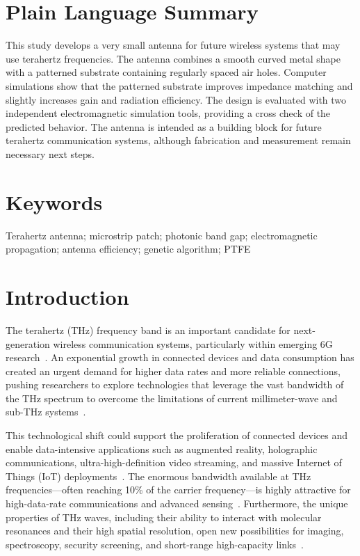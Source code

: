 \documentclass[draft]{agujournal2019}
\begin{document}
\section*{Plain Language Summary}
This study develops a very small antenna for future wireless systems that may use terahertz frequencies. The antenna combines a smooth curved metal shape with a patterned substrate containing regularly spaced air holes. Computer simulations show that the patterned substrate improves impedance matching and slightly increases gain and radiation efficiency. The design is evaluated with two independent electromagnetic simulation tools, providing a cross check of the predicted behavior. The antenna is intended as a building block for future terahertz communication systems, although fabrication and measurement remain necessary next steps.

\section*{Keywords}
Terahertz antenna; microstrip patch; photonic band gap; electromagnetic propagation; antenna efficiency; genetic algorithm; PTFE

\section{Introduction}
The terahertz (THz) frequency band is an important candidate for next-generation wireless communication systems, particularly within emerging 6G research~\cite{strinati_6g_2019,he_overview_2020}. An exponential growth in connected devices and data consumption has created an urgent demand for higher data rates and more reliable connections, pushing researchers to explore technologies that leverage the vast bandwidth of the THz spectrum to overcome the limitations of current millimeter-wave and sub-THz systems~\cite{jamshed_antenna_2020,hajiyat_antenna_2021}.

This technological shift could support the proliferation of connected devices and enable data-intensive applications such as augmented reality, holographic communications, ultra-high-definition video streaming, and massive Internet of Things (IoT) deployments~\cite{jornet_internet_2012,amin_step_2022}. The enormous bandwidth available at THz frequencies---often reaching 10\% of the carrier frequency---is highly attractive for high-data-rate communications and advanced sensing~\cite{sen_physical_2022}. Furthermore, the unique properties of THz waves, including their ability to interact with molecular resonances and their high spatial resolution, open new possibilities for imaging, spectroscopy, security screening, and short-range high-capacity links~\cite{nissanov_terahertz_2023,krishna_rhombus_2021}.
\end{document}
